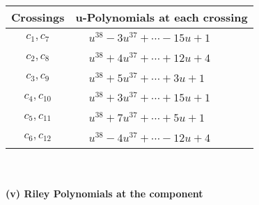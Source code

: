 \documentclass[1p]{elsarticle_modified}
\theoremstyle{definition}
\begin{document}
\begin{tabular}{m{50pt}|m{274pt}}
Crossings & \hspace{64pt}u-Polynomials at each crossing \\
\hline $$\begin{aligned}c_{1},c_{7}\end{aligned}$$&$\begin{aligned}
&u^{38}-3 u^{37}+\cdots-15 u+1
\end{aligned}$\\
\hline $$\begin{aligned}c_{2},c_{8}\end{aligned}$$&$\begin{aligned}
&u^{38}+4 u^{37}+\cdots+12 u+4
\end{aligned}$\\
\hline $$\begin{aligned}c_{3},c_{9}\end{aligned}$$&$\begin{aligned}
&u^{38}+5 u^{37}+\cdots+3 u+1
\end{aligned}$\\
\hline $$\begin{aligned}c_{4},c_{10}\end{aligned}$$&$\begin{aligned}
&u^{38}+3 u^{37}+\cdots+15 u+1
\end{aligned}$\\
\hline $$\begin{aligned}c_{5},c_{11}\end{aligned}$$&$\begin{aligned}
&u^{38}+7 u^{37}+\cdots+5 u+1
\end{aligned}$\\
\hline $$\begin{aligned}c_{6},c_{12}\end{aligned}$$&$\begin{aligned}
&u^{38}-4 u^{37}+\cdots-12 u+4
\end{aligned}$\\
\hline
\end{tabular}\\~\\
\newpage\renewcommand{\arraystretch}{1}
\flushleft \textbf{(v) Riley Polynomials at the component}\newline \\
\end{document}
